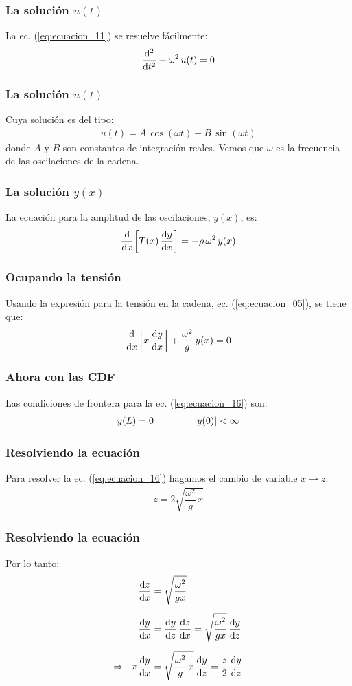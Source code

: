 \documentclass[12pt]{beamer}
\begin{document}
\begin{frame}
\frametitle{La solución $u (t)$}
La ec. (\ref{eq:ecuacion_11}) se resuelve fácilmente:
\pause
\begin{align}
\dv[2]{t} + \omega^{2} \, u (t) = 0
\label{eq:ecuacion_13}
\end{align}
\end{frame}
\begin{frame}
\frametitle{La solución $u (t)$}
Cuya solución es del tipo:
\pause
\begin{align}
u (t) = A \, \cos (\omega t) + B \, \sin (\omega t)
\label{eq:ecuacion_14}
\end{align}
\pause
donde $A$ y $B$ son constantes de integración reales. \pause Vemos que $\omega$ es la frecuencia de las oscilaciones de la cadena.
\end{frame}
\begin{frame}
\frametitle{La solución $y (x)$}
La ecuación para la amplitud de las oscilaciones, $y (x)$, es:
\pause
\begin{align}
\dv{x} \bigg[ T (x) \, \dv{y}{x} \bigg] = - \rho \, \omega^{2} \, y (x)
\label{eq:ecuacion_15}
\end{align}
\end{frame}
\begin{frame}
\frametitle{Ocupando la tensión}
Usando la expresión para la tensión en la cadena, ec. (\ref{eq:ecuacion_05}), se tiene que:
\pause
\begin{align}
\dv{x} \bigg[ x \, \dv{y}{x} \bigg] + \dfrac{\omega^{2}}{g} \, y(x) = 0
\label{eq:ecuacion_16}
\end{align}
\end{frame}
\begin{frame}
\frametitle{Ahora con las CDF}
Las condiciones de frontera para la ec. (\ref{eq:ecuacion_16}) son:
\pause
\begin{align}
y (L) = 0 \hspace{1.5cm} \abs{y (0)} < \infty
\label{eq:ecuacion_17}
\end{align}
\end{frame}
\begin{frame}
\frametitle{Resolviendo la ecuación}
Para resolver la ec. (\ref{eq:ecuacion_16}) hagamos el cambio de variable $x \to z$:
\pause
\begin{align}
z = 2 \sqrt{\dfrac{\omega^{2}}{g} \, x}
\label{eq:ecuacion_18}
\end{align}
\end{frame}
\begin{frame}
\frametitle{Resolviendo la ecuación}
Por lo tanto:
\pause
\begin{align}
\begin{aligned}[b]
\dv{z}{x} &= \sqrt{\dfrac{\omega^{2}}{g x}} \\[0.5em]
\dv{y}{x} &= \dv{y}{z} \, \dv{z}{x} = \sqrt{\dfrac{\omega^{2}}{g x}} \, \dv{y}{z} \\[0.5em]
\Rightarrow \hspace{0.2cm} x \, \dv{y}{x} &= \sqrt{\dfrac{\omega^{2}}{g} \, x} \, \dv{y}{z} = \dfrac{z}{2} \, \dv{y}{z}
\end{aligned}
\label{eq:ecuacion_19}
\end{align}
\end{frame}
\end{document}

